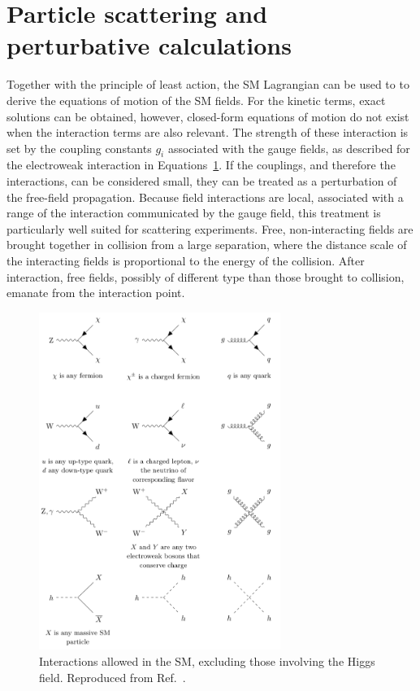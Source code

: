 \section{Particle scattering and perturbative calculations}

Together with the principle of least action, the SM Lagrangian 
can be used to to derive the equations of motion of the SM fields. For the kinetic
terms, exact solutions can be obtained, however, closed-form equations of motion
do not exist when the interaction terms are also relevant.
The strength of these interaction is set by the coupling constants $g_i$
associated with the gauge fields, as described for the electroweak interaction
in Equations~\ref{}. If the couplings, and therefore the interactions, can be 
considered small, they can be treated as a perturbation of the free-field
propagation. Because field interactions are local, associated with 
a range of the interaction communicated by the gauge field,
this treatment is particularly well suited for scattering experiments.
Free, non-interacting fields are brought together in collision 
from a large separation, where the distance scale of the interacting fields
is proportional to the energy of the collision. After interaction,
free fields, possibly of different type than those brought to collision,
emanate from the interaction point.

\begin{figure}[htbp]
  \centering
   \includegraphics[width=0.7\textwidth]{figures/Phenomenology/Standard_Model_Feynman_Diagram_Vertices.png}
  \caption[Interactions allowed in the SM, excluding those involving the Higgs field]{
    Interactions allowed in the SM, excluding those involving the Higgs field.
    Reproduced from Ref.~\cite{Smith:2646356}.
        }
 \label{fig:SMinteractions}
\end{figure}

